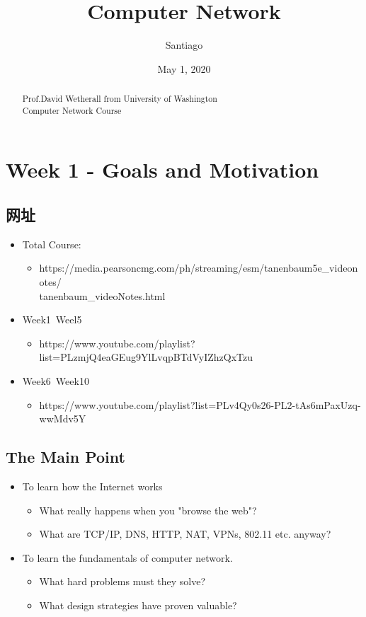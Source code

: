 \documentclass[12pt]{ctexart}   %
\title{ Computer Network }
\author{Santiago}
\date{May 1, 2020}
\begin{document}
\maketitle %

\begin{abstract}
	Prof.David Wetherall from University of Washington \\
	Computer Network Course 
\end{abstract}

\section{Week 1 - Goals and Motivation}
	\subsection{网址}
	\begin{itemize}
		\item Total Course: 
		\begin{itemize}
			\item https://media.pearsoncmg.com/ph/streaming/esm/tanenbaum5e\_videonotes/ \\
			tanenbaum\_videoNotes.html
		\end{itemize}
		\item Week1~Weel5 
		\begin{itemize}
			\item https://www.youtube.com/playlist?list=PLzmjQ4eaGEug9YlLvqpBTdVyIZhzQxTzu
		\end{itemize}
		\item Week6~Week10
		\begin{itemize}
			\item	https://www.youtube.com/playlist?list=PLv4Qy0s26-PL2-tAs6mPaxUzq-wwMdv5Y
		\end{itemize}
	
	\end{itemize}
	\subsection{The Main Point}
	\begin{itemize}
		\item To learn how the Internet works
		\begin{itemize}
			\item What really happens when you "browse the web"?
			\item What are TCP/IP, DNS, HTTP, NAT, VPNs, 802.11 etc. anyway?
		\end{itemize}		 
		\item To learn the fundamentals of computer network.
		\begin{itemize}
			\item What hard problems must they solve?
			\item What design strategies have proven valuable?
		\end{itemize}
	\end{itemize}
\end{document}

